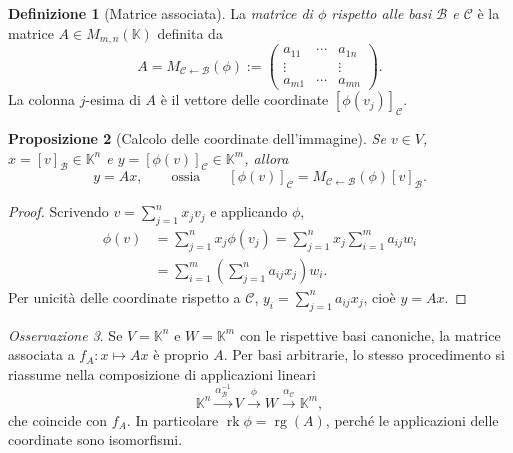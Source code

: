 \documentclass[11pt,a4paper]{article}
\newcommand{\KK}{\mathbb{K}}
\theoremstyle{plain}
\newtheorem{prop}{Proposizione}[section]
\theoremstyle{definition}
\newtheorem{defn}[prop]{Definizione}
\theoremstyle{remark}
\newtheorem{oss}[prop]{Osservazione}
\begin{document}
\begin{defn}[Matrice associata]
La \emph{matrice di $\phi$ rispetto alle basi $\mathcal B$ e
$\mathcal C$} è la matrice $A\in M_{m,n}(\KK)$ definita da
\[
 A=M_{\mathcal C\leftarrow\mathcal B}(\phi)
 :=\begin{pmatrix}
 a_{11}&\cdots&a_{1n}\\
 \vdots&&\vdots\\
 a_{m1}&\cdots&a_{mn}
 \end{pmatrix}.
\]
La colonna $j$-esima di $A$ è il vettore delle coordinate
$[\phi(v_j)]_{\mathcal C}$.
\end{defn}

\begin{prop}[Calcolo delle coordinate dell'immagine]
Se $v\in V$, $x=[v]_{\mathcal B}\in\KK^n$ e
$y=[\phi(v)]_{\mathcal C}\in\KK^m$, allora
\[
 y=Ax,
 \qquad\text{ossia}\qquad
 [\phi(v)]_{\mathcal C}
 =M_{\mathcal C\leftarrow\mathcal B}(\phi)[v]_{\mathcal B}.
\]
\end{prop}
\begin{proof}
Scrivendo $v=\sum_{j=1}^n x_jv_j$ e applicando $\phi$,
\begin{align*}
 \phi(v)
 &=\sum_{j=1}^n x_j\phi(v_j)
 =\sum_{j=1}^n x_j\sum_{i=1}^m a_{ij}w_i\\
 &=\sum_{i=1}^m\left(\sum_{j=1}^n a_{ij}x_j\right)w_i.
\end{align*}
Per unicità delle coordinate rispetto a $\mathcal C$,
$y_i=\sum_{j=1}^n a_{ij}x_j$, cioè $y=Ax$.
\end{proof}

\begin{oss}
Se $V=\KK^n$ e $W=\KK^m$ con le rispettive basi canoniche,
la matrice associata a $f_A:x\mapsto Ax$ è proprio $A$.
Per basi arbitrarie, lo stesso procedimento si riassume nella
composizione di applicazioni lineari
\[
 \KK^n\xrightarrow{\alpha_{\mathcal B}^{-1}}V
 \xrightarrow{\phi}W\xrightarrow{\alpha_{\mathcal C}}\KK^m,
\]
che coincide con $f_A$. In particolare
$\operatorname{rk}\phi=\operatorname{rg}(A)$, perché le
applicazioni delle coordinate sono isomorfismi.
\end{oss}
\end{document}
